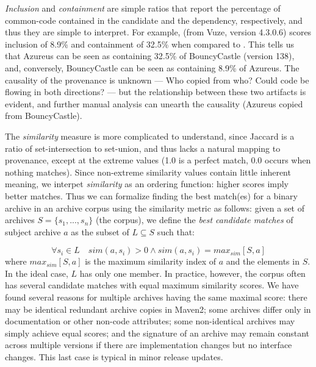 \emph{Inclusion} and \emph{containment} are simple ratios
that report the percentage of common-code contained in the
candidate and the dependency, respectively, and thus they
are simple to interpret.  For example,
 (from Vuze, version 4.3.0.6) scores
inclusion of 8.9\% and containment
of 32.5\% when compared to .
This tells us that Azureus can be seen as containing 32.5\%
of BouncyCastle (version 138), and, conversely, BouncyCastle
can be seen as containing 8.9\% of Azureus.  The causality of
the provenance is unknown --- Who copied from who?  Could
code be flowing in both directions? --- but the relationship
between these two artifacts is evident, and further manual
analysis can unearth the causality
(Azureus copied from BouncyCastle).

The \emph{similarity} measure is more complicated to
understand, since Jaccard is a ratio of set-intersection
to set-union, and  thus lacks a natural mapping to provenance,
except at the extreme values (1.0 is a perfect match,
0.0 occurs when nothing matches).
Since non-extreme similarity values contain little inherent
meaning, we interpet \emph{similarity} as an ordering function:
higher scores imply better matches.
Thus we can formalize finding the best match(es) for a binary
archive in an archive corpus using the similarity metric as
follows: given a set of archives $S = \{ s_1, ..., s_n\}$
(the corpus), we define the \emph{best candidate matches}
of subject archive $a$ as the subset of $L \subseteq S$ such that:

\[ \forall s_i \in L \quad sim(a,s_i) > 0 \wedge sim(a,s_i) = max_{sim}[S, a]  \]
where $max_{sim}[S, a]$ is the maximum similarity index of $a$ and the
elements in $S$.
In the ideal case, $L$ has only one member.  In practice,
however, the corpus often has several candidate matches with equal maximum
similarity scores.  We have found several reasons for multiple archives
having the same maximal score: there may be identical redundant archive
copies in Maven2; some archives differ only in documentation or other
non-code attributes; some non-identical archives may simply achieve equal
scores;
and the signature of an archive may
remain constant across multiple versions if there are implementation
changes but no interface changes.  This last case is typical in minor
release updates.

